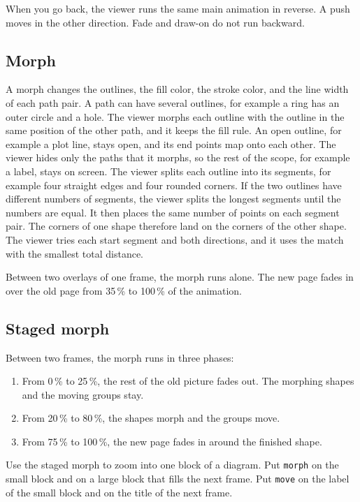 \documentclass[11pt]{article}
\newcommand{\cmd}[1]{\texttt{#1}}
\begin{document}
When you go back, the viewer runs the same main animation in reverse. A push
moves in the other direction. Fade and draw-on do not run backward.

\subsection{Morph}

A morph changes the outlines, the fill color, the stroke color, and the line
width of each path pair. A path can have several outlines, for example a ring
has an outer circle and a hole. The viewer morphs each outline with the outline
in the same position of the other path, and it keeps the fill rule. An open
outline, for example a plot line, stays open, and its end points map onto each
other. The viewer hides only the paths that it morphs, so the rest of the scope,
for example a label, stays on screen. The viewer splits each outline into its segments, for example
four straight edges and four rounded corners. If the two outlines have different
numbers of segments, the viewer splits the longest segments until the numbers are
equal. It then places the same number of points on each segment pair. The
corners of one shape therefore land on the corners of the other shape. The
viewer tries each start segment and both directions, and it uses the match with
the smallest total distance.

Between two overlays of one frame, the morph runs alone. The new page fades in
over the old page from 35\,\% to 100\,\% of the animation.

\subsection{Staged morph}

Between two frames, the morph runs in three phases:
\begin{enumerate}
	\item From 0\,\% to 25\,\%, the rest of the old picture fades out. The morphing
	      shapes and the moving groups stay.
	\item From 20\,\% to 80\,\%, the shapes morph and the groups move.
	\item From 75\,\% to 100\,\%, the new page fades in around the finished shape.
\end{enumerate}
Use the staged morph to zoom into one block of a diagram. Put \cmd{morph} on the
small block and on a large block that fills the next frame. Put \cmd{move} on the
label of the small block and on the title of the next frame.
\end{document}
